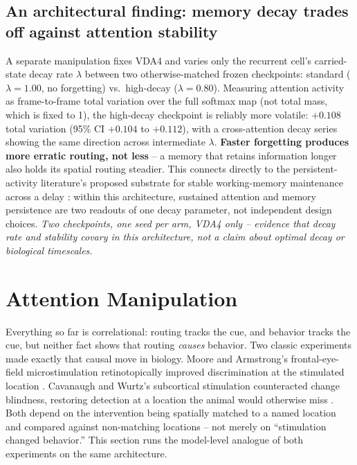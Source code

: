 \documentclass[10pt]{article}
\newcommand{\note}[1]{\textcolor{NoteGray}{\textit{#1}}}
\begin{document}
\subsection{An architectural finding: memory decay trades off against attention stability}\label{sec:architecture-thread}
A separate manipulation fixes VDA4 and varies only the recurrent cell's carried-state decay rate $\lambda$ between two otherwise-matched frozen checkpoints: standard ($\lambda=1.00$, no forgetting) vs.\ high-decay ($\lambda=0.80$). Measuring attention activity as frame-to-frame total variation over the full softmax map (not total mass, which is fixed to 1), the high-decay checkpoint is reliably more volatile: $+0.108$ total variation (95\% CI $+0.104$ to $+0.112$), with a cross-attention decay series showing the same direction across intermediate $\lambda$. \textbf{Faster forgetting produces more erratic routing, not less} -- a memory that retains information longer also holds its spatial routing steadier. This connects directly to the persistent-activity literature's proposed substrate for stable working-memory maintenance across a delay \cite{luck1997,awh2001}: within this architecture, sustained attention and memory persistence are two readouts of one decay parameter, not independent design choices. \note{Two checkpoints, one seed per arm, VDA4 only -- evidence that decay rate and stability covary in this architecture, not a claim about optimal decay or biological timescales.}

\FloatBarrier
\section{Attention Manipulation}\label{sec:intervention}
Everything so far is correlational: routing tracks the cue, and behavior tracks the cue, but neither fact shows that routing \emph{causes} behavior. Two classic experiments made exactly that causal move in biology. Moore and Armstrong's frontal-eye-field microstimulation retinotopically improved discrimination at the stimulated location \cite{moore2003}. Cavanaugh and Wurtz's subcortical stimulation counteracted change blindness, restoring detection at a location the animal would otherwise miss \cite{cavanaugh2004}. Both depend on the intervention being spatially matched to a named location and compared against non-matching locations -- not merely on ``stimulation changed behavior.'' This section runs the model-level analogue of both experiments on the same architecture.
\end{document}
